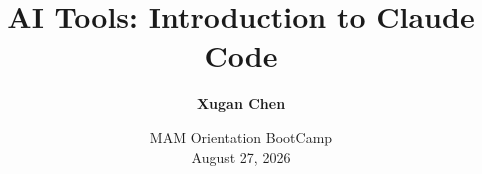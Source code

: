 %
%
%
%
%
%
%

\documentclass[11pt,aspectratio=169]{beamer}



\graphicspath{{./figures/}}

\title[AI Tools: Introduction to Claude Code]{\Large AI Tools: Introduction to Claude Code}
\author[Chen]{\normalsize \textbf{Xugan Chen}}
\date{\small MAM Orientation BootCamp \\ August 27, 2026 \\\vs {}}



\linespread{1.4}

\begin{frame}[plain]
\titlepage
\end{frame}

